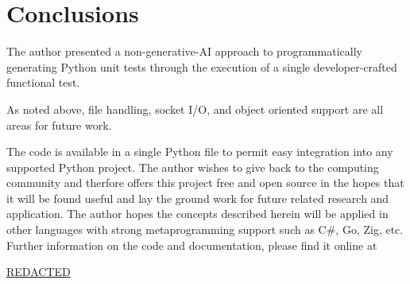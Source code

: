 \section{Conclusions}\label{sec:conclusions}

The author presented a non-generative-AI approach to 
programmatically generating Python unit tests through
the execution of a single developer-crafted functional test.

As noted above, file handling, socket I/O, 
and object oriented support are all areas for future work.  

The code is available in a single Python file to permit 
easy integration into any supported Python project.
The author wishes to give back to the computing community
and therfore offers this project free and open source
in the hopes that it will be found useful and lay the ground
work for future related research and application.
The author hopes the concepts described herein will be 
applied in other languages with strong metaprogramming support
such as C\#, Go, Zig, etc.  Further information on the code and  documentation, please
find it online at
%
\begin{center}
  \url{REDACTED}
\end{center}


